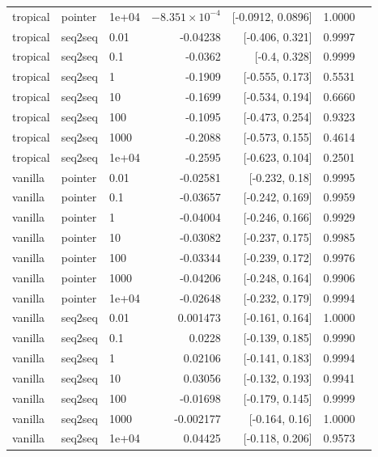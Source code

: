 \documentclass[10pt]{article}
\begin{document}
{\begin{longtable}{lllrrrl}
tropical & pointer & 1e+04 & $-8.351\times10^{-4}$ & [-0.0912, 0.0896] & 1.0000 & \\
tropical & seq2seq & 0.01 & -0.04238 & [-0.406, 0.321] & 0.9997 & \\
tropical & seq2seq & 0.1 & -0.0362 & [-0.4, 0.328] & 0.9999 & \\
tropical & seq2seq & 1 & -0.1909 & [-0.555, 0.173] & 0.5531 & \\
tropical & seq2seq & 10 & -0.1699 & [-0.534, 0.194] & 0.6660 & \\
tropical & seq2seq & 100 & -0.1095 & [-0.473, 0.254] & 0.9323 & \\
tropical & seq2seq & 1000 & -0.2088 & [-0.573, 0.155] & 0.4614 & \\
tropical & seq2seq & 1e+04 & -0.2595 & [-0.623, 0.104] & 0.2501 & \\
vanilla & pointer & 0.01 & -0.02581 & [-0.232, 0.18] & 0.9995 & \\
vanilla & pointer & 0.1 & -0.03657 & [-0.242, 0.169] & 0.9959 & \\
vanilla & pointer & 1 & -0.04004 & [-0.246, 0.166] & 0.9929 & \\
vanilla & pointer & 10 & -0.03082 & [-0.237, 0.175] & 0.9985 & \\
vanilla & pointer & 100 & -0.03344 & [-0.239, 0.172] & 0.9976 & \\
vanilla & pointer & 1000 & -0.04206 & [-0.248, 0.164] & 0.9906 & \\
vanilla & pointer & 1e+04 & -0.02648 & [-0.232, 0.179] & 0.9994 & \\
vanilla & seq2seq & 0.01 & 0.001473 & [-0.161, 0.164] & 1.0000 & \\
vanilla & seq2seq & 0.1 & 0.0228 & [-0.139, 0.185] & 0.9990 & \\
vanilla & seq2seq & 1 & 0.02106 & [-0.141, 0.183] & 0.9994 & \\
vanilla & seq2seq & 10 & 0.03056 & [-0.132, 0.193] & 0.9941 & \\
vanilla & seq2seq & 100 & -0.01698 & [-0.179, 0.145] & 0.9999 & \\
vanilla & seq2seq & 1000 & -0.002177 & [-0.164, 0.16] & 1.0000 & \\
vanilla & seq2seq & 1e+04 & 0.04425 & [-0.118, 0.206] & 0.9573 & \\
\bottomrule
\end{longtable}
}
\end{document}
